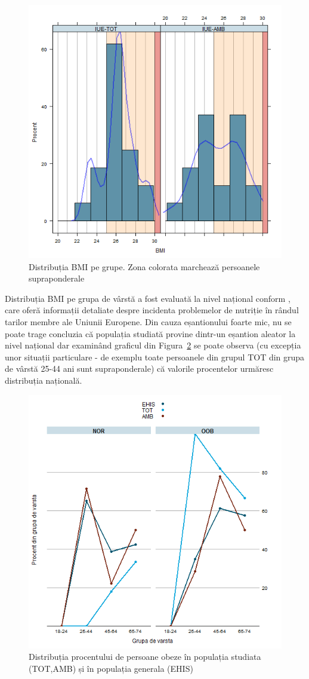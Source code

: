 \documentclass[12pt,draft]{article}
\begin{document}
  \begin{figure}[H]
    \centering
    \includegraphics[width=0.8\linewidth]{totBMIDens}
    \caption{Distribuția \ac{BMI} pe grupe. Zona colorata marchează persoanele supraponderale}
    \label{fig:totBMIDens}
  \end{figure}
  Distribuția \ac{BMI} pe grupa de vârstă a fost evaluată la nivel național conform \citep{EHIS09}, care oferă informații detaliate despre incidenta problemelor de nutriție în rândul tarilor membre ale Uniunii Europene. 
  Din cauza eșantionului foarte mic, nu se poate trage concluzia că populația studiată provine dintr-un eșantion aleator la nivel național dar examinând graficul din Figura~\ref{fig:totBMIvsEHIS-full} se poate observa (cu excepția unor situații particulare - de exemplu toate persoanele din grupul TOT din grupa de vârstă 25-44 ani sunt supraponderale) că valorile procentelor urmăresc distribuția națională.
  \begin{figure}[H]
    \centering
    \includegraphics[width=0.8\linewidth]{totBMIvsEHIS-full}
    \caption{Distribuția procentului de persoane obeze în populația studiata (TOT,AMB) și în populația generala (EHIS) }
    \label{fig:totBMIvsEHIS-full}
  \end{figure}
\end{document}
